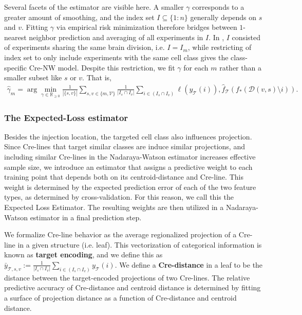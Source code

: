 Several facets of the estimator are visible here. %
A smaller $\gamma$ corresponds to a greater amount of smoothing, and the index set $I \subseteq  \{1:n\}$ generally depends on $s$ and $v$.
Fitting $\gamma$ via empirical risk minimization therefore bridges between $1$-nearest neighbor prediction and averaging of all experiments in $I$.
In \citet{Knox2019-ot}, $I$ consisted of experiments sharing the same brain division, i.e. $I = I_m$, while restricting of index set to only include experiments with the same cell class gives the class-specific Cre-NW model.
Despite this restriction, we fit $\gamma$ for each $m$ rather than a smaller subset like $s$ or $v$.
That is,
\begin{eqnarray}
\label{eq:gamma_sel}
\widehat \gamma_m =  \arg \min_{\gamma \in \mathbb R_{\geq 0}} \frac{1}{|\{s,v\}|} \sum_{s,v \in \{m,\mathcal V\}} \frac{1}{ |I_{s} \cap I_v |} \sum_{i \in (I_{s} \cap I_v ) } \ell (y_{\mathcal T}(i)), \hat f_{\mathcal T} (f_*(\mathcal D(v,s) \setminus i)) .
\end{eqnarray}

\newpage
\subsubsection{The Expected-Loss estimator}

\label{supp_sec:el}

Besides the injection location, the targeted cell class also influences projection.
Since Cre-lines that target similar classes are induce similar projections, and including similar Cre-lines in the Nadaraya-Watson estimator increases effective sample size, we introduce an estimator that assigns a predictive weight to each training point that depends both on its centroid-distance and Cre-line.
This weight is determined by the expected prediction error of each of the two feature types, as determined by cross-validation.
For this reason, we call this the Expected Loss Estimator.
The resulting weights are then utilized in a Nadaraya-Watson estimator in a final prediction step.

We formalize Cre-line behavior as the average regionalized projection of a Cre-line in a given structure (i.e. leaf).
This vectorization of categorical information is known as \textbf{target encoding}, and we define this as $\bar y_{\mathcal T,s,v} := \frac{1}{|I_s \cap I_v|}  \sum_{i \in (I_s \cap I_v)} y_{\mathcal T}(i)$.
We define a \textbf{Cre-distance} in a leaf to be the distance between the target-encoded projections of two Cre-lines.
The relative predictive accuracy of Cre-distance and centroid distance is determined by fitting a surface of projection distance as a function of Cre-distance and centroid distance. 

